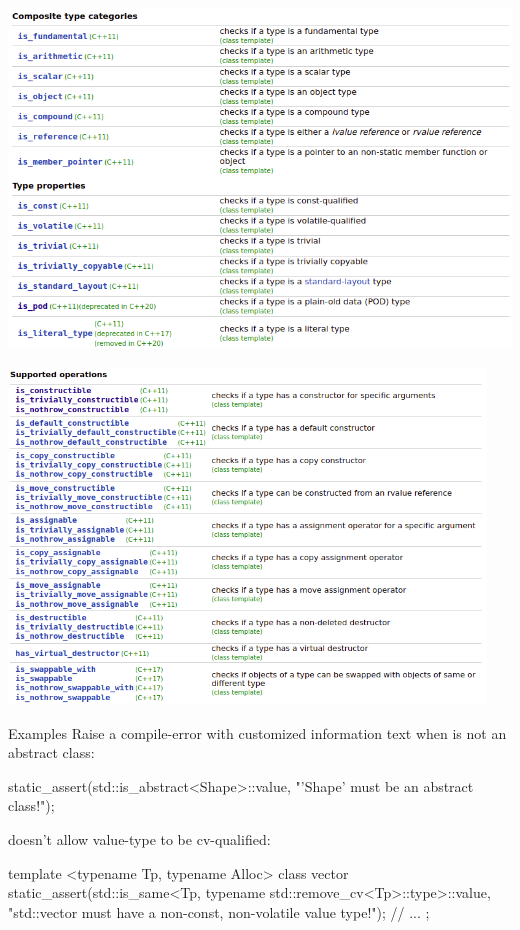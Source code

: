 \begin{frame}{}
    \begin{center}
        \includegraphics[width = \textwidth]{img/typetraits2.png}
    \end{center}
\end{frame}

\begin{frame}{}
    \begin{center}
        \includegraphics[width = 0.95\textwidth]{img/typetraits3.png}
    \end{center}
\end{frame}

\begin{frame}[fragile]{Examples}
    Raise a compile-error with customized information text when  is not an abstract class:
    \begin{cpp}
static_assert(std::is_abstract<Shape>::value,
              "'Shape' must be an abstract class!");
    \end{cpp}
    \pause
     doesn't allow value-type to be cv-qualified:
    \begin{cpp}
template <typename Tp, typename Alloc>
class vector {
  static_assert(std::is_same<Tp, typename std::remove_cv<Tp>::type>::value, "std::vector must have a non-const, non-volatile value type!");
  // ...
};
    \end{cpp}
\end{frame}


